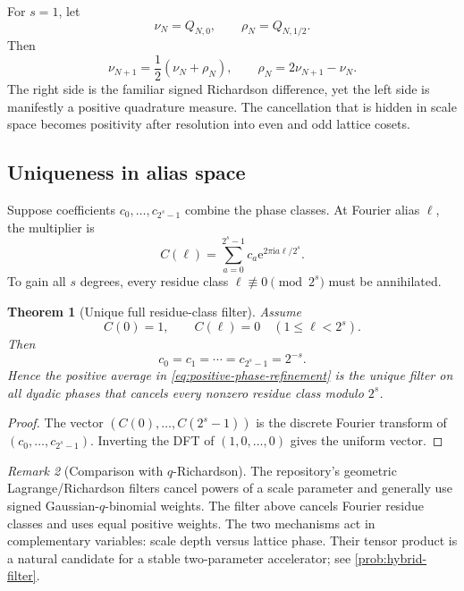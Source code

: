 \documentclass[11pt]{article}
\numberwithin{equation}{section}
\newtheorem{theorem}{Theorem}[section]
\theoremstyle{definition}
\theoremstyle{remark}
\newtheorem{remark}[theorem]{Remark}
\newcommand{\e}{\mathrm e}
\newcommand{\iu}{\mathrm i}
\begin{document}
For $s=1$, let
\[
 \nu_N=Q_{N,0},
 \qquad
 \rho_N=Q_{N,1/2}.
\]
Then
\begin{equation}
 \nu_{N+1}=\frac12(\nu_N+\rho_N),
 \qquad
 \boxed{\rho_N=2\nu_{N+1}-\nu_N.}
 \label{eq:midpoint-Richardson}
\end{equation}
The right side is the familiar signed Richardson difference, yet the left side is manifestly a positive quadrature measure.  The cancellation that is hidden in scale space becomes positivity after resolution into even and odd lattice cosets.

\subsection{Uniqueness in alias space}

Suppose coefficients $c_0,\ldots,c_{2^s-1}$ combine the phase classes.  At Fourier alias $\ell$, the multiplier is
\begin{equation}
 C(\ell)=\sum_{a=0}^{2^s-1}c_a\e^{2\pi\iu a\ell/2^s}.
 \label{eq:DFT-filter}
\end{equation}
To gain all $s$ degrees, every residue class $\ell\not\equiv0\pmod{2^s}$ must be annihilated.

\begin{theorem}[Unique full residue-class filter]
\label{thm:unique-phase-filter}
Assume
\begin{equation}
 C(0)=1,
 \qquad
 C(\ell)=0\quad(1\le\ell<2^s).
 \label{eq:DFT-conditions}
\end{equation}
Then
\begin{equation}
 c_0=c_1=\cdots=c_{2^s-1}=2^{-s}.
 \label{eq:unique-uniform-filter}
\end{equation}
Hence the positive average in \eqref{eq:positive-phase-refinement} is the unique filter on all dyadic phases that cancels every nonzero residue class modulo $2^s$.
\end{theorem}

\begin{proof}
The vector $(C(0),\ldots,C(2^s-1))$ is the discrete Fourier transform of $(c_0,\ldots,c_{2^s-1})$.  Inverting the DFT of $(1,0,\ldots,0)$ gives the uniform vector.
\end{proof}

\begin{remark}[Comparison with $q$-Richardson]
The repository's geometric Lagrange/Richardson filters cancel powers of a scale parameter and generally use signed Gaussian-$q$-binomial weights.  The filter above cancels Fourier residue classes and uses equal positive weights.  The two mechanisms act in complementary variables: scale depth versus lattice phase.  Their tensor product is a natural candidate for a stable two-parameter accelerator; see \cref{prob:hybrid-filter}.
\end{remark}
\end{document}
